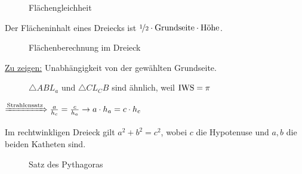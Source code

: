 \begin{figure}[ht]
    \centering
    \label{fig:flaechengleichheit}
    \caption{Flächengleichheit}
\end{figure}

Der Flächeninhalt eines Dreiecks ist $\nicefrac{1}{2} \cdot \text{Grundseite} \cdot \text{Höhe}$.

\begin{figure}[htp]
    \centering
    \caption{Flächenberechnung im Dreieck}
    \label{fig:flaechenberechnung-dreieck}
\end{figure}

\underline{Zu zeigen:} Unabhängigkeit von der gewählten Grundseite.

\begin{figure}[htp]
    \centering
    
    \caption{$\triangle ABL_a$ und $\triangle C{L_C}B$ sind ähnlich, weil $\operatorname{IWS} = \pi$}
    \label{fig:flaechenberechnung-dreieck-2}
\end{figure}

$\xRightarrow{\text{Strahlensatz}} \frac{a}{h_c} = \frac{c}{h_a} \rightarrow a \cdot h_a = c \cdot h_c$

\begin{satz}
    Im rechtwinkligen Dreieck gilt $a^2 + b^2 = c^2$, wobei $c$ die
    Hypotenuse und $a, b$ die beiden Katheten sind.
\end{satz}

\begin{figure}[ht]
    \centering
    \subfloat[Beweisskizze]{
        
        \label{fig:pythagoras-2}
    }%
    \label{fig:pythagoras}
    \caption{Satz des Pythagoras}
\end{figure}

